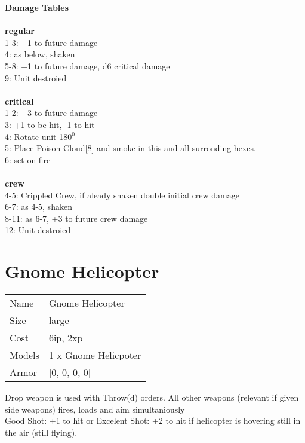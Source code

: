{\bf Damage Tables} \\
\ \\ {\bf regular } \\
1-3: +1 to future damage \\
4: as below, shaken \\
5-8: +1 to future damage, d6 critical damage \\
9: Unit destroied \\
\ \\ {\bf critical } \\
1-2: +3 to future damage \\
3: +1 to be hit, -1 to hit \\
4: Rotate unit 180$^0$ \\
5: Place Poison Cloud[8] and smoke in this and all surronding hexes. \\
6: set on fire \\
\ \\ {\bf crew } \\
4-5: Crippled Crew, if aleady shaken double initial crew damage \\
6-7: as 4-5, shaken \\
8-11: as 6-7, +3 to future crew damage \\
12: Unit destroied \\










\pagebreak\pagebreak

\section{ Gnome Helicopter }

\begin{tabular}{ll}
  Name & Gnome Helicopter \\
  Size & large\\
  Cost & 6ip, 2xp\\
  Models & 1 x Gnome Helicpoter\\
  Armor & [0, 0, 0, 0]\\
\end{tabular}

\noindent Drop weapon is used with Throw(d) orders. All other weapons (relevant if given side weapons) fires, loads and aim simultaniously\\ 
Good Shot: +1 to hit or Excelent Shot: +2 to hit if helicopter is hovering still in the air (still flying).\\ 


